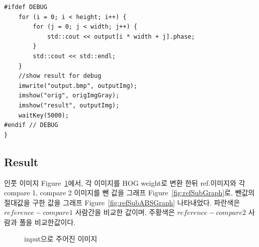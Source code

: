 \documentclass[a4paper]{article}
\begin{document}
{\begin{spacing}{1}
\begin{verbatim}
#ifdef DEBUG
    for (i = 0; i < height; i++) {
        for (j = 0; j < width; j++) {
            std::cout << output[i * width + j].phase;
        }
        std::cout << std::endl;
    }
    //show result for debug
    imwrite("output.bmp", outputImg);
    imshow("orig", origImgGray);
    imshow("result", outputImg);
    waitKey(5000);
#endif // DEBUG
}

\end{verbatim}
\end{spacing}
}


\subsection{Result}
인풋 이미지 Figure~\ref{fig:refImg}에서, 각 이미지를 HOG weight로 변환 한뒤 ref.이미지와 각 compare 1, compare 2 이미지를 뺀 값을 그래프 Figure~\ref{fig:refSubGraph}로, 뺀값의 절대값을 구한 값을 그래프 Figure~\ref{fig:refSubABSGraph} 나타내었다. 파란색은 $reference - compare1$ 사람간을 비교한 값이며, 주황색은 $reference - compare2$ 사람과 풀을 비교한값이다.
\begin{figure}
    \centering
    \quad
    \centering
    \quad
    \centering
    \caption{input으로 주어진 이미지}
\label{fig:refImg}
\end{figure}
\end{document}
